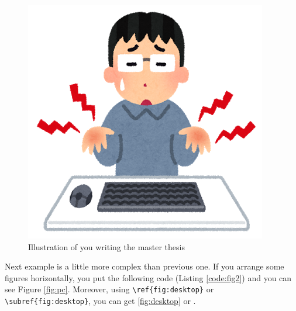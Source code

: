 \begin{figure}[htbp]
  \centering
  \includegraphics[scale=0.45]{./Figure/computer_keyboard_hand_itai.png}
  \caption{Illustration of you writing the master thesis}
  \label{fig:itai}
\end{figure}

Next example is a little more complex than previous one. If you arrange some figures horizontally, you put the following code (Listing \ref{code:fig2}) and you can see Figure \ref{fig:pc}. Moreover, using \verb+\ref{fig:desktop}+ or \verb+\subref{fig:desktop}+, you can get \ref{fig:desktop} or .

